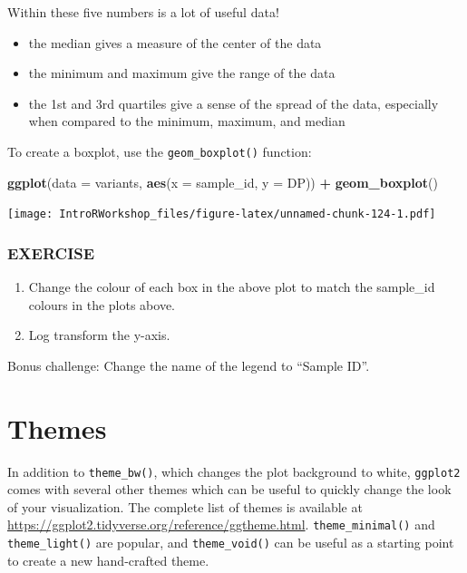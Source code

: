 \documentclass[]{book}
\newenvironment{Shaded}{\begin{snugshade}}{\end{snugshade}}
\newcommand{\DataTypeTok}[1]{\textcolor[rgb]{0.13,0.29,0.53}{#1}}
\newcommand{\KeywordTok}[1]{\textcolor[rgb]{0.13,0.29,0.53}{\textbf{#1}}}
\newcommand{\NormalTok}[1]{#1}
\newcommand{\OperatorTok}[1]{\textcolor[rgb]{0.81,0.36,0.00}{\textbf{#1}}}
\newcommand{\StringTok}[1]{\textcolor[rgb]{0.31,0.60,0.02}{#1}}
\providecommand{\tightlist}{%
  \setlength{\itemsep}{0pt}\setlength{\parskip}{0pt}}
\begin{document}
Within these five numbers is a lot of useful data!

\begin{itemize}
\tightlist
\item
  the median gives a measure of the center of the data
\item
  the minimum and maximum give the range of the data
\item
  the 1st and 3rd quartiles give a sense of the spread of the data, especially when compared to the minimum, maximum, and median
\end{itemize}

To create a boxplot, use the \texttt{geom\_boxplot()} function:

\begin{Shaded}
\begin{Highlighting}[]
\KeywordTok{ggplot}\NormalTok{(}\DataTypeTok{data =}\NormalTok{ variants, }\KeywordTok{aes}\NormalTok{(}\DataTypeTok{x =}\NormalTok{ sample_id, }\DataTypeTok{y =}\NormalTok{ DP)) }\OperatorTok{+}\StringTok{ }
\StringTok{  }\KeywordTok{geom_boxplot}\NormalTok{()}
\end{Highlighting}
\end{Shaded}

\texttt{[image: IntroRWorkshop\_files/figure-latex/unnamed-chunk-124-1.pdf]}

\hypertarget{exercise-28}{%
\subsubsection*{EXERCISE}\label{exercise-28}}

\begin{enumerate}
\def\labelenumi{\arabic{enumi}.}
\tightlist
\item
  Change the colour of each box in the above plot to match the sample\_id colours in the plots above.
\item
  Log transform the y-axis.
\end{enumerate}

Bonus challenge: Change the name of the legend to ``Sample ID''.

\hypertarget{themes}{%
\section{Themes}\label{themes}}

In addition to \texttt{theme\_bw()}, which changes the plot background to white, \texttt{ggplot2} comes with several other themes which can be useful to quickly change the look of your visualization. The complete list of themes is available at \url{https://ggplot2.tidyverse.org/reference/ggtheme.html}. \texttt{theme\_minimal()} and \texttt{theme\_light()} are popular, and \texttt{theme\_void()} can be useful as a starting point to create a new hand-crafted theme.
\end{document}
